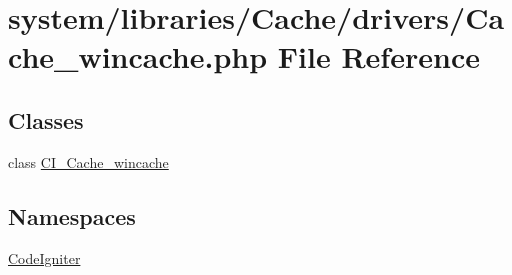 \hypertarget{_cache__wincache_8php}{}\section{system/libraries/\+Cache/drivers/\+Cache\+\_\+wincache.php File Reference}
\label{_cache__wincache_8php}
\subsection*{Classes}
\begin{DoxyCompactItemize}
\item 
class \mbox{\hyperlink{class_c_i___cache__wincache}{C\+I\+\_\+\+Cache\+\_\+wincache}}
\end{DoxyCompactItemize}
\subsection*{Namespaces}
\begin{DoxyCompactItemize}
\item 
 \mbox{\hyperlink{namespace_code_igniter}{Code\+Igniter}}
\end{DoxyCompactItemize}
